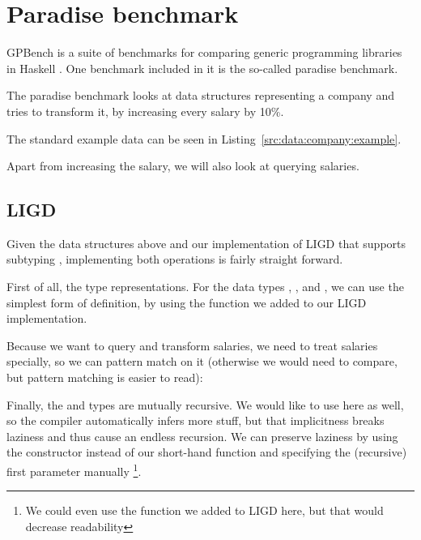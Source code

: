 \section{Paradise benchmark}
GPBench is a suite of benchmarks for comparing generic programming
libraries in Haskell \cite{DBLP:conf/haskell/RodriguezJJGKO08}. One
benchmark included in it is the so-called paradise benchmark.

The paradise benchmark looks at data structures representing a company
and tries to transform it, by increasing every salary by 10\%.{}



The standard example data can be seen in Listing~\ref{src:data:company:example}.



Apart from increasing the salary, we will also look at querying salaries.


\subsection{LIGD}

Given the data structures above and our implementation of LIGD that supports
subtyping , implementing both operations is fairly straight forward.

First of all, the type representations. For the data types ,
, and , we can use the simplest form of definition,
by using the  function we added to our LIGD implementation.



Because we want to query and transform salaries, we need to treat salaries
specially, so we can pattern match on it (otherwise we would need to compare,
but pattern matching is easier to read):



Finally, the  and  types are mutually recursive. We would
like to use  here as well, so the compiler automatically infers more
stuff, but that implicitness breaks laziness and thus cause an endless
recursion. We can preserve laziness by using the  constructor instead
of our short-hand  function and specifying the (recursive) first
parameter manually \footnote{We could even use the  function we added to
LIGD here, but that would decrease readability}.


